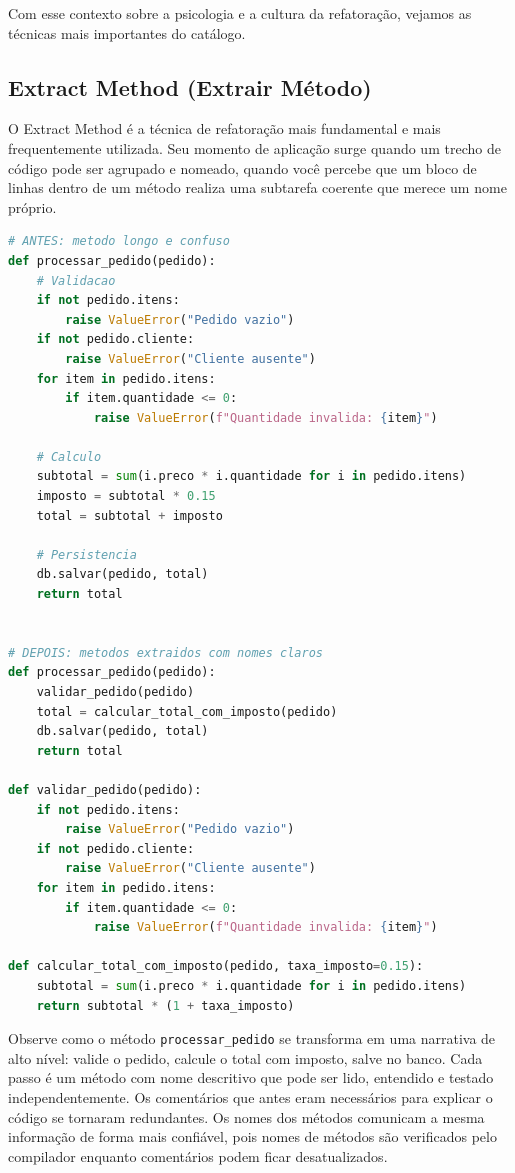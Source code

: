Com esse contexto sobre a psicologia e a cultura da refatoração, vejamos as
técnicas mais importantes do catálogo.

\subsection{Extract Method (Extrair Método)}

O Extract Method é a técnica de refatoração mais fundamental e mais
frequentemente utilizada. Seu momento de aplicação surge quando um trecho
de código pode ser agrupado e nomeado, quando você percebe que um
bloco de linhas dentro de um método realiza uma subtarefa coerente que
merece um nome próprio.

\begin{lstlisting}[language=Python, caption={Refatoração: Extract Method}]
# ANTES: metodo longo e confuso
def processar_pedido(pedido):
    # Validacao
    if not pedido.itens:
        raise ValueError("Pedido vazio")
    if not pedido.cliente:
        raise ValueError("Cliente ausente")
    for item in pedido.itens:
        if item.quantidade <= 0:
            raise ValueError(f"Quantidade invalida: {item}")

    # Calculo
    subtotal = sum(i.preco * i.quantidade for i in pedido.itens)
    imposto = subtotal * 0.15
    total = subtotal + imposto

    # Persistencia
    db.salvar(pedido, total)
    return total


# DEPOIS: metodos extraidos com nomes claros
def processar_pedido(pedido):
    validar_pedido(pedido)
    total = calcular_total_com_imposto(pedido)
    db.salvar(pedido, total)
    return total

def validar_pedido(pedido):
    if not pedido.itens:
        raise ValueError("Pedido vazio")
    if not pedido.cliente:
        raise ValueError("Cliente ausente")
    for item in pedido.itens:
        if item.quantidade <= 0:
            raise ValueError(f"Quantidade invalida: {item}")

def calcular_total_com_imposto(pedido, taxa_imposto=0.15):
    subtotal = sum(i.preco * i.quantidade for i in pedido.itens)
    return subtotal * (1 + taxa_imposto)
\end{lstlisting}

Observe como o método \texttt{processar\_pedido} se transforma em uma
narrativa de alto nível: valide o pedido, calcule o total com imposto,
salve no banco. Cada passo é um método com nome descritivo que pode ser
lido, entendido e testado independentemente. Os comentários que antes
eram necessários para explicar o código se tornaram redundantes. Os
nomes dos métodos comunicam a mesma informação de forma mais confiável,
pois nomes de métodos são verificados pelo compilador enquanto comentários
podem ficar desatualizados.

